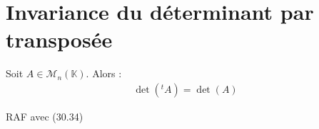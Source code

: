\documentclass[../main.tex]{subfiles}
\begin{document}
\section{Invariance du déterminant par transposée}
\begin{tcolorbox}[title=Théorème 30.41, title filled=false, colframe=orange, colback=orange!10!white]
    Soit $A\in \mathcal{M}_n(\mathbb{K})$. Alors :
    \begin{align*}
        \operatorname{det}(^tA) = \operatorname{det}(A)
    \end{align*}
\end{tcolorbox}

\noindent RAF avec (30.34)
\end{document}
